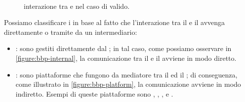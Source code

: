 %

\begin{figure}[tbhp]%
\centering
{}\\
%
\caption[Interazione tra \emph{\acs{BI}} e \emph{\acs{BH}}]{interazione tra \BI e \BH nel caso di \bugreport valido.}
\label{figure:bbp-interaction}
\end{figure}

Possiamo classificare i \BBP in base al fatto che l'interazione tra il \BI e il \BH avvenga direttamente o tramite da un intermediario:

\begin{itemize}

\item \InternalBBP: sono \BBP gestiti direttamente dal \BI \cite{hoffman2021bountychain}; in tal caso, come possiamo osservare in \cref{figure:bbp-internal}, la comunicazione tra il \BI e il \BH avviene in modo diretto.

\item \BugBountyPlatform: sono piattaforme che fungono da mediatore tra il \BI ed il \BH \cite{hoffman2021bountychain}; di conseguenza, come illustrato in \cref{figure:bbp-platform}, la comunicazione avviene in modo indiretto.
Esempi di queste piattaforme sono \HackerOne, \Intigriti, \Bugcrowd, \Synack e \Yogosha \cite{walshe2023bountythesis3, walshe2020bountypaper}. 

\end{itemize}

